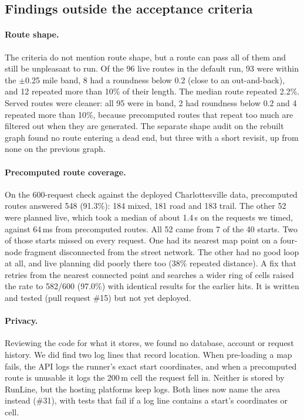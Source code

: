\subsection{Findings outside the acceptance criteria}
\paragraph{Route shape.}
The criteria do not mention route shape, but a route can pass all of them and
still be unpleasant to run. Of the 96 live routes in the default run, 93 were
within the $\pm$0.25 mile band, 8 had a roundness below 0.2 (close to an
out-and-back), and 12 repeated more than 10\% of their length. The median
route repeated 2.2\%. Served routes were cleaner: all 95 were in band, 2 had
roundness below 0.2 and 4 repeated more than 10\%, because precomputed routes
that repeat too much are filtered out when they are generated. The separate
shape audit on the rebuilt graph found no route entering a dead end, but
three with a short revisit, up from none on the previous graph.

\paragraph{Precomputed route coverage.}
On the 600-request check against the deployed Charlottesville data,
precomputed routes answered 548 (91.3\%): 184 mixed, 181 road and 183 trail.
The other 52 were planned live, which took a median of about 1.4\,s on the
requests we timed, against 64\,ms from precomputed routes. All 52
came from 7 of the 40 starts. Two of those starts missed on every request. One
had its nearest map point on a four-node fragment disconnected from the
street network. The other had no good loop at all, and live planning did
poorly there too (38\% repeated distance). A fix that retries from the nearest
connected point and searches a wider ring of cells raised the rate to
582/600 (97.0\%) with identical results for the earlier hits. It is written
and tested (pull request \#15) but not yet deployed.

\paragraph{Privacy.}
Reviewing the code for what it stores, we found no database, account or
request history. We did find two log lines that record location. When
pre-loading a map fails, the API logs the runner's exact start coordinates,
and when a precomputed route is unusable it logs the 200\,m cell the request
fell in. Neither is stored by RunLine, but the hosting platforms keep logs.
Both lines now name the area instead (\#31), with tests that fail if a log
line contains a start's coordinates or cell.

